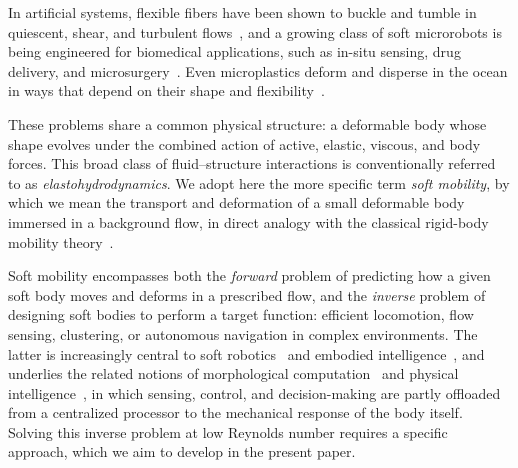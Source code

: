 \documentclass[aps,prfluids,groupedaddress]{revtex4-2}
\begin{document}
In artificial systems, flexible fibers have been shown to buckle and tumble in quiescent, shear, and turbulent flows~\cite{Wiggins1998,Brouzet2014,Du-Roure2019,Zuk2021}, and a growing class of soft microrobots is being engineered for biomedical applications, such as in-situ sensing, drug delivery, and microsurgery~\cite{Sitti2021,Yasa2023,Tsang2020b,Elnaggar2024,Dabbagh2022,Mo2023,Jiang2022}.
Even microplastics deform and disperse in the ocean in ways that depend on their shape and flexibility~\cite{Sutherland2023}. 

These problems share a common physical structure: a deformable body whose shape evolves under the combined action of active, elastic, viscous, and body forces. 
This broad class of fluid--structure interactions is conventionally referred to as \emph{elastohydrodynamics}. 
We adopt here the more specific term \emph{soft mobility}, by which we mean the transport and deformation of a small deformable body immersed in a background flow, in direct analogy with the classical rigid-body mobility theory~\cite{Brenner1963,Happel2012,Kim2013}. 

Soft mobility encompasses both the \emph{forward} problem of predicting how a given soft body moves and deforms in a prescribed flow, and the \emph{inverse} problem of designing soft bodies to perform a target function: efficient locomotion, flow sensing, clustering, or autonomous navigation in complex environments. 
The latter is increasingly central to soft robotics~\cite{Kim2013a,Yasa2023} and embodied intelligence~\cite{Pfeifer2006}, and underlies the related notions of morphological computation~\cite{Pfeifer2014,Hauser2011,Hauser2014,Nakajima2015} and physical intelligence~\cite{Sitti2021,Hauser2023}, in which sensing, control, and decision-making are partly offloaded from a centralized processor to the mechanical response of the body itself.
Solving this inverse problem at low Reynolds number requires a specific approach, which we aim to develop in the present paper.
\end{document}
